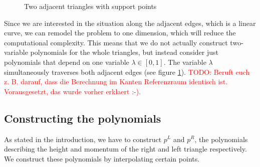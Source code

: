 \documentclass{article}
\newcommand{\todo}[2][]{\textcolor{red}{TODO\ifthenelse{\equal{#1}{}}{}{[#1]}: #2}}
\begin{document}
\begin{figure}[ht]
  \centering
  \caption{Two adjacent triangles with support points}
  \label{fig:two-triangles-and-some-support-points}
\end{figure}

Since we are interested in the situation along the adjacent edges, which is a linear curve, we can remodel the problem to one dimension, which will reduce the computational complexity. This means that we do not actually construct two-variable polynomials for the whole triangles, but instead consider just polynomials that depend on one variable $\lambda \in [0,1]$. The variable $\lambda$ simultaneously traverses both adjacent edges (see figure \ref{fig:two-triangles-and-some-support-points}).
\todo{Beruft euch z. B. darauf, dass die Berechnung im Kanten Referenzraum identisch ist. Vorausgesetzt, das wurde vorher erklaert :-).}

\subsection{Constructing the polynomials}
\label{sec:constructing-polynomials}

As stated in the introduction, we have to construct $p^L$ and $p^R$, the polynomials describing the height and momentum of the right and left triangle respectively. We construct these polynomials by interpolating certain points.
\end{document}
